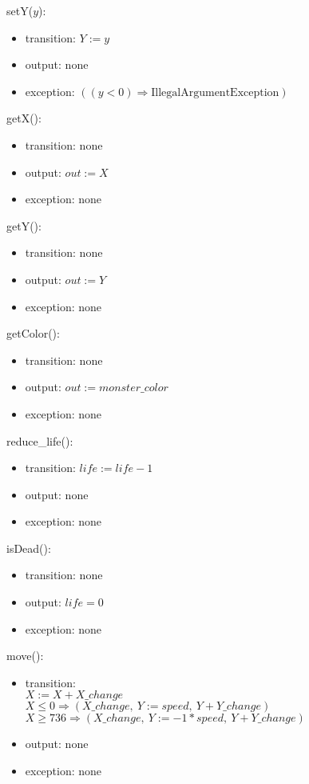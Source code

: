 \documentclass[12pt]{article}
\begin{document}
\noindent setY($\mathit{y}$):
\begin{itemize}
\item transition: $Y := y$ 
\item output: none
\item exception: $((\mathit{y} < 0) \Rightarrow \text{IllegalArgumentException})$
\end{itemize}

\noindent getX():
\begin{itemize}
\item transition: none
\item output: $out := X$
\item exception: none
\end{itemize}

\noindent getY():
\begin{itemize}
\item transition: none
\item output: $out := Y$
\item exception: none
\end{itemize}

\noindent getColor():
\begin{itemize}
\item transition: none
\item output: $out := monster\_color$
\item exception: none
\end{itemize}

\noindent reduce\_life():
\begin{itemize}
\item transition: $life := life - 1$
\item output: none
\item exception: none
\end{itemize}

\noindent isDead():
\begin{itemize}
\item transition: none
\item output: $life = 0$
\item exception: none
\end{itemize}

\noindent move():
\begin{itemize}
\item transition: \\
$X := X + X\_change$\\
$X \leq 0 \Rightarrow (X\_change,\ Y  := speed,\ Y + Y\_change)$\\
$X \geq 736 \Rightarrow (X\_change,\ Y  := -1*speed,\ Y + Y\_change)$
\item output: none
\item exception: none
\end{itemize}
\end{document}
